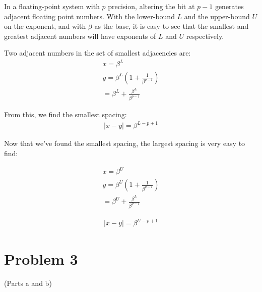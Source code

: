 \documentclass[paper=a4, fontsize=11pt]{scrartcl} %
\numberwithin{equation}{section} %
\numberwithin{figure}{section} %
\numberwithin{table}{section} %
\begin{document}
In a floating-point system with $p$ precision, altering the bit at $p - 1$ generates adjacent floating point numbers. With the lower-bound $L$ and the upper-bound $U$ on the exponent, and with $\beta$ as the base, it is easy to see that the smallest and greatest adjacent numbers will have exponents of $L$ and $U$ respectively. 

Two adjacent numbers in the set of smallest adjacencies are:
\begin{align}
	x = \beta^L \\
	y = \beta^L(1 + \frac{1}{\beta^{p - 1}}) \\
	  = \beta^L + \frac{\beta^L}{\beta^{p - 1}}
\end{align}

From this, we find the smallest spacing:
\begin{align}
	|x - y| = \beta^{L - p + 1}
\end{align}

Now that we've found the smallest spacing, the largest spacing is very easy to find:

\begin{align}
		x = \beta^U \\
		y = \beta^U(1 + \frac{1}{\beta^{p - 1}}) \\
		  = \beta^U + \frac{\beta^L}{\beta^{p - 1}}
\end{align}

\begin{align}
	|x - y| = \beta^{U - p + 1}
\end{align}



\section{Problem 3}
(Parts a and b) \\
\end{document}
